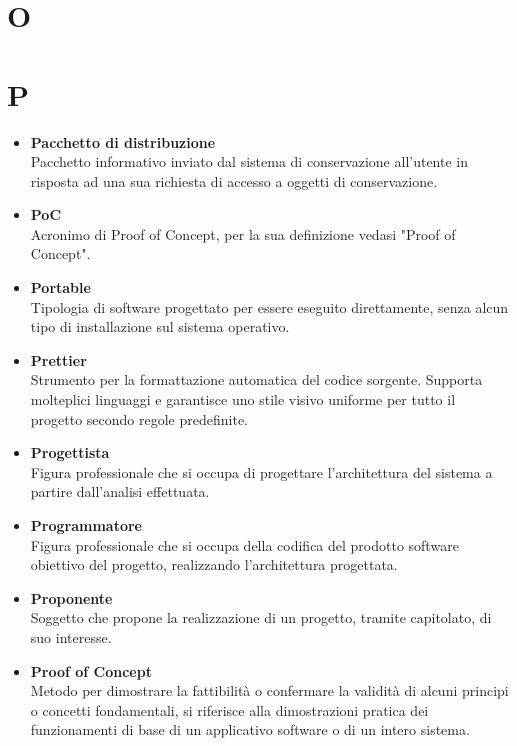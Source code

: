 \documentclass[a4paper,12pt]{article}
\begin{document}
        \section*{O} {
            
        }
        \newpage

        \section*{P} {
            \begin{itemize}
                \item \textbf{Pacchetto di distribuzione}\\
                    Pacchetto informativo inviato dal sistema di conservazione all’utente in risposta ad una sua richiesta di accesso a oggetti di conservazione.
                \item \textbf{PoC}\\
                    Acronimo di Proof of Concept, per la sua definizione vedasi "Proof of Concept".
                \item \textbf{Portable}\\
                    Tipologia di software progettato per essere eseguito direttamente, senza alcun tipo di installazione sul sistema operativo.
                \item \textbf{Prettier}\\
                    Strumento per la formattazione automatica del codice sorgente. Supporta molteplici linguaggi e garantisce uno stile visivo uniforme per tutto il progetto secondo regole predefinite.
                \item \textbf{Progettista}\\
                    Figura professionale che si occupa di progettare l'architettura del sistema a partire dall'analisi effettuata.
                \item \textbf{Programmatore}\\
                    Figura professionale che si occupa della codifica del prodotto software obiettivo del progetto, realizzando l'architettura progettata.
                \item \textbf{Proponente}\\
                    Soggetto che propone la realizzazione di un progetto, tramite capitolato, di suo interesse.
                \item \textbf{Proof of Concept}\\
                    Metodo per dimostrare la fattibilità o confermare la validità di alcuni principi o concetti fondamentali, si riferisce alla dimostrazioni pratica dei funzionamenti di base di un applicativo software o di un intero sistema.
            \end{itemize}
        }
        \newpage
\end{document}
